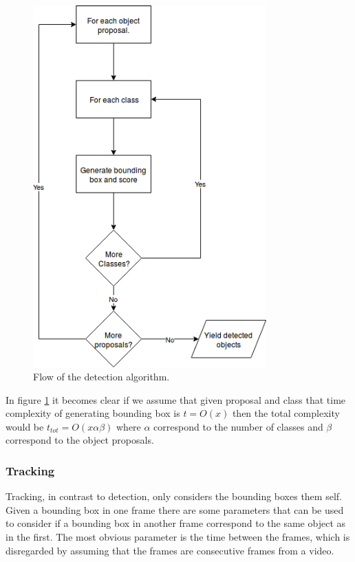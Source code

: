 \documentclass[a4paper]{article}
\begin{document}
\begin{figure}[H]
  \begin{center}
    \includegraphics[width=0.8\textwidth]{figures/Detection_flow}
  \end{center}
  \caption{ Flow of the detection algorithm.}
  \label{fig:Det_flow}
\end{figure}

In figure \ref{fig:Det_flow} it becomes clear if we assume that given proposal and class that time complexity of generating bounding box is \(t=O(x)\) then the total complexity would be \(t_{tot}=O(x\alpha\beta)\) where \(\alpha\) correspond to the number of classes and \(\beta\) correspond to the object proposals.

\subsubsection{Tracking}

Tracking, in contrast to detection, only considers the bounding boxes them self.
Given a bounding box in one frame there are some parameters that can be used to consider if a bounding box in another frame correspond to the same object as in the first.
The most obvious parameter is the time between the frames, which is disregarded by assuming that the frames are consecutive frames from a video.
\end{document}
